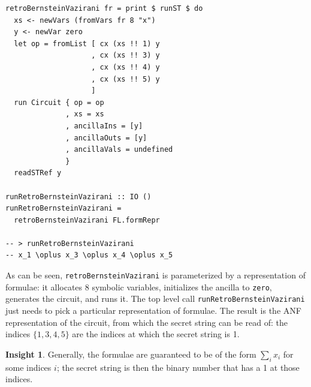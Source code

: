 \documentclass[sigplan,screen]{acmart}
\newcommand{\h}[1]{\texttt{#1}}
\theoremstyle{definition}
\newtheorem*{insight}{Insight}
\begin{document}
\begin{verbatim}
retroBernsteinVazirani fr = print $ runST $ do                                    
  xs <- newVars (fromVars fr 8 "x")                                               
  y <- newVar zero                                                                
  let op = fromList [ cx (xs !! 1) y                                              
                    , cx (xs !! 3) y                                              
                    , cx (xs !! 4) y                                              
                    , cx (xs !! 5) y                                              
                    ]                                                             
  run Circuit { op = op                                                           
              , xs = xs                                                           
              , ancillaIns = [y]                                                  
              , ancillaOuts = [y]                                                 
              , ancillaVals = undefined                                           
              }                                                                   
  readSTRef y                                                                     
                                                                                  
runRetroBernsteinVazirani :: IO ()                                                
runRetroBernsteinVazirani = 
  retroBernsteinVazirani FL.formRepr                    
                            
-- > runRetroBernsteinVazirani 
-- x_1 \oplus x_3 \oplus x_4 \oplus x_5
\end{verbatim}
As can be seen, \h{retroBernsteinVazirani} is parameterized by a
representation of formulae: it allocates 8 symbolic variables,
initializes the ancilla to \h{zero}, generates the circuit, and runs
it. The top level call \h{runRetroBernsteinVazirani} just needs to
pick a particular representation of formulae. The result is the ANF
representation of the circuit, from which the secret string can be
read of: the indices $\{1,3,4,5\}$ are the indices at which the secret
string is 1.

\begin{insight}
  Generally, the formulae are guaranteed to be of the form
  $\sum_i x_i$ for some indices $i$; the secret string is then the
  binary number that has a 1 at those indices.
\end{insight}
\end{document}
